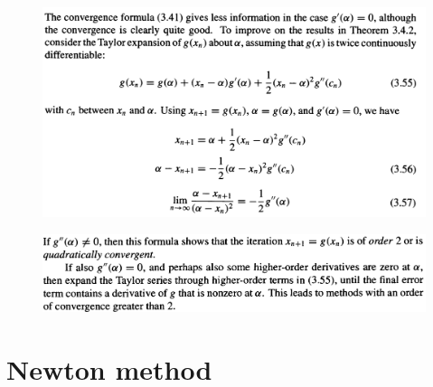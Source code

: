 \documentclass[12pt]{article}
\theoremstyle{theorem}
\begin{document}
\begin{figure}[H]
\centering
\includegraphics[scale=1.0]{Figures/screenshot0012}
\label{fig:screenshot0012}
\end{figure}

\begin{figure}[h!]
\centering
\includegraphics[scale=1.0]{Figures/screenshot0013}
\label{fig:screenshot0013}
\end{figure}

\cleardoublepage

\section{Newton method}
\end{document}
